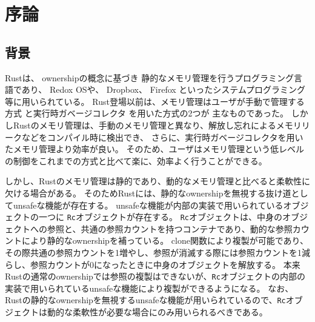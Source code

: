 \documentclass{sumiilab-paper}
\theoremstyle{mystyle}
\numberwithin{definition}{chapter} %
\begin{document}
\tableofcontents%

\mainmatter%

\chapter{序論}
\section{背景}
Rust\cite{DBLP:conf/sigada/MatsakisK14, rust-web, rust-book}は、
ownership\cite{DBLP:conf/oopsla/ClarkePN98}の概念に基づき
静的なメモリ管理を行うプログラミング言語であり、
Redox OS\cite{redox}や、
Dropbox\cite{dropbox}、
Firefox\cite{fire}
といったシステムプログラミング等に用いられている\cite{rust-web}。
Rust登場以前は、メモリ管理はユーザが手動で管理する方式
\cite{c-book}
と実行時ガベージコレクタ\cite{gc-book}
を用いた方式の2つが
主なものであった。
しかしRustのメモリ管理は、手動のメモリ管理と異なり、解放し忘れによるメモリリークなどをコンパイル時に検出でき、
さらに、実行時ガベージコレクタを用いたメモリ管理より効率が良い。
そのため、ユーザはメモリ管理という低レベルの制御をこれまでの方式と比べて楽に、効率よく行うことができる。

しかし、Rustのメモリ管理は静的であり、動的なメモリ管理と比べると柔軟性に欠ける場合がある。
そのためRustには、静的なownershipを無視する抜け道としてunsafeな機能が存在する。
unsafeな機能が内部の実装で用いられているオブジェクトの一つに
\texttt{Rc}オブジェクト\cite{rc}が存在する。
\texttt{Rc}オブジェクトは、中身のオブジェクトへの参照と、共通の参照カウントを持つコンテナであり、動的な参照カウントにより静的なownershipを補っている。
clone関数により複製が可能であり、その際共通の参照カウントを1増やし、参照が消滅する際には参照カウントを1減らし、参照カウントが0になったときに中身のオブジェクトを解放する。
本来Rustの通常のownershipでは参照の複製はできないが、\texttt{Rc}オブジェクトの内部の実装で用いられているunsafeな機能により複製ができるようになる。
なお、Rustの静的なownershipを無視するunsafeな機能が用いられているので、\texttt{Rc}オブジェクトは動的な柔軟性が必要な場合にのみ用いられるべきである。
\end{document}
